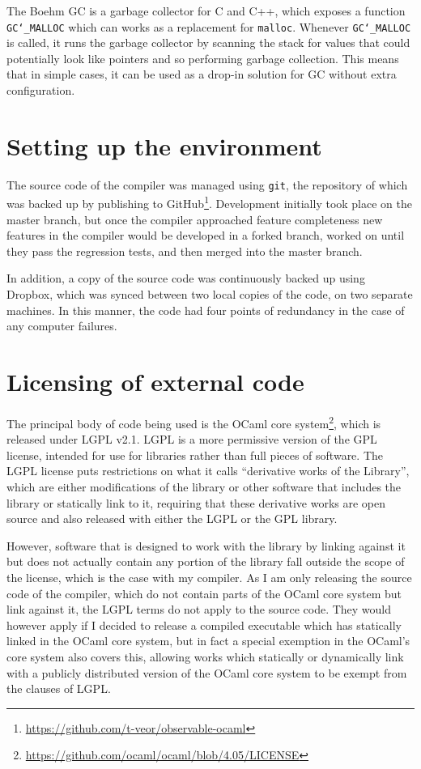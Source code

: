 The Boehm GC is a garbage collector for C and C++, which exposes a function
\texttt{GC\char`_MALLOC} which can works as a replacement for \texttt{malloc}.
Whenever \texttt{GC\char`_MALLOC} is called, it runs the garbage collector by
scanning the stack for values that could potentially look like pointers and so
performing garbage collection. This means that in simple cases, it can be used
as a drop-in solution for GC without extra configuration.

\section{Setting up the environment}

The source code of the compiler was managed using \texttt{git}, the repository
of which was backed up by publishing to
GitHub\footnote{\url{https://github.com/t-veor/observable-ocaml}}. Development
initially took place on the master branch, but once the compiler approached
feature completeness new features in the compiler would be developed in a forked
branch, worked on until they pass the regression tests, and then merged into the
master branch.

In addition, a copy of the source code was continuously backed up using Dropbox,
which was synced between two local copies of the code, on two separate machines.
In this manner, the code had four points of redundancy in the case of any
computer failures.

\section{Licensing of external code}

The principal body of code being used is the OCaml core
system\footnote{\url{https://github.com/ocaml/ocaml/blob/4.05/LICENSE}}, which
is released under LGPL v2.1. LGPL is a more permissive version of the GPL
license, intended for use for libraries rather than full pieces of software. The
LGPL license puts restrictions on what it calls ``derivative works of the
Library'', which are either modifications of the library or other software that
includes the library or statically link to it, requiring that these derivative
works are open source and also released with either the LGPL or the GPL library.

However, software that is designed to work with the library by linking against
it but does not actually contain any portion of the library fall outside the
scope of the license, which is the case with my compiler. As I am only releasing
the source code of the compiler, which do not contain parts of the OCaml core
system but link against it, the LGPL terms do not apply to the source code. They
would however apply if I decided to release a compiled executable which has
statically linked in the OCaml core system, but in fact a special exemption in
the OCaml's core system also covers this, allowing works which statically or
dynamically link with a publicly distributed version of the OCaml core system
to be exempt from the clauses of LGPL.

